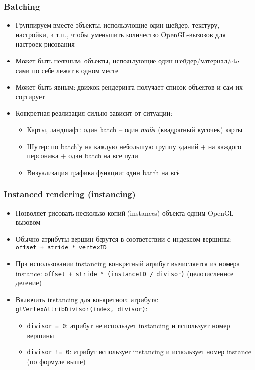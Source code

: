\documentclass{beamer}
\begin{document}
\begin{frame}[fragile]
\frametitle{Batching}
\begin{itemize}
\item Группируем вместе объекты, использующие один шейдер, текстуру, настройки, и т.п., чтобы уменьшить количество OpenGL-вызовов для настроек рисования
\pause
\item Может быть неявным: объекты, использующие один шейдер/материал/etc сами по себе лежат в одном месте
\pause
\item Может быть явным: движок рендеринга получает список объектов и сам их сортирует
\pause
\item Конкретная реализация сильно зависит от ситуации:
\pause
\begin{itemize}
\item Карты, ландшафт: один batch -- один \textit{тайл} (квадратный кусочек) карты
\pause
\item Шутер: по batch'у на каждую небольшую группу зданий + на каждого персонажа + один batch на все пули
\pause
\item Визуализация графика функции: один batch на всё
\end{itemize}
\end{itemize}
\end{frame}

\begin{frame}[fragile]
\frametitle{Instanced rendering (instancing)}
\begin{itemize}
\item Позволяет рисовать несколько копий (instances) объекта одним OpenGL-вызовом
\pause
\item Обычно атрибуты вершин берутся в соответствии с индексом вершины: \verb|offset + stride * vertexID|
\pause
\item При использовании instancing конкретный атрибут вычисляется из номера instance: \verb|offset + stride * (instanceID / divisor)| (целочисленное деление)
\pause
\item Включить instancing для конкретного атрибута: \verb|glVertexAttribDivisor(index, divisor)|:
\begin{itemize}
\item \verb|divisor = 0|: атрибут не использует instancing и использует номер вершины
\item \verb|divisor != 0|: атрибут использует instancing и использует номер instance (по формуле выше)
\end{itemize}
\end{itemize}
\end{frame}
\end{document}
